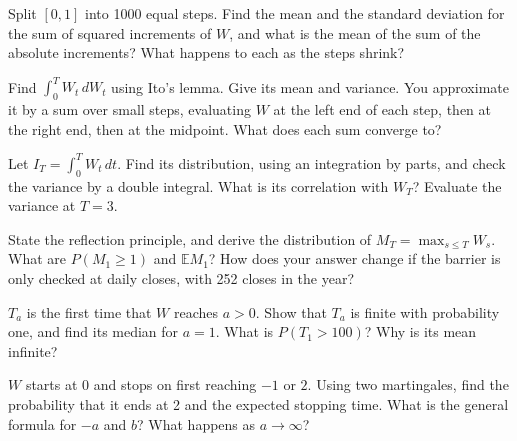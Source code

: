 \begin{question}\label{iq:iv1:stochastic-calculus:6}
Split $[0, 1]$ into 1000 equal steps. Find the mean and the standard deviation for the sum of squared increments of $W$, and what is the mean of the sum of the absolute increments? What happens to each as the steps shrink?
\end{question}

\begin{question}\label{iq:iv1:stochastic-calculus:7}
Find $\int_0^TW_t\,dW_t$ using Ito's lemma. Give its mean and variance. You approximate it by a sum over small steps, evaluating $W$ at the left end of each step, then at the right end, then at the midpoint. What does each sum converge to?
\end{question}

\begin{question}\label{iq:iv1:stochastic-calculus:8}
Let $I_T = \int_0^TW_t\,dt$. Find its distribution, using an integration by parts, and check the variance by a double integral. What is its correlation with $W_T$? Evaluate the variance at $T = 3$.
\end{question}

\begin{question}\label{iq:iv1:stochastic-calculus:9}
State the reflection principle, and derive the distribution of $M_T = \max_{s \le T}W_s$. What are $P(M_1 \ge 1)$ and $\mathbb{E}M_1$? How does your answer change if the barrier is only checked at daily closes, with 252 closes in the year?
\end{question}

\begin{question}\label{iq:iv1:stochastic-calculus:10}
$T_a$ is the first time that $W$ reaches $a > 0$. Show that $T_a$ is finite with probability one, and find its median for $a = 1$. What is $P(T_1 > 100)$? Why is its mean infinite?
\end{question}

\begin{question}\label{iq:iv1:stochastic-calculus:11}
$W$ starts at 0 and stops on first reaching $-1$ or $2$. Using two martingales, find the probability that it ends at 2 and the expected stopping time. What is the general formula for $-a$ and $b$? What happens as $a \to \infty$?
\end{question}

